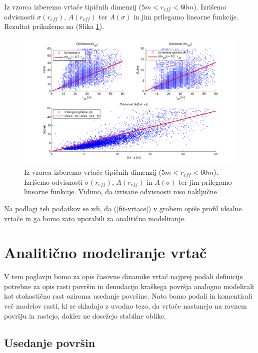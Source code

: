 \documentclass[a4paper, twoside, 12pt]{book}
\begin{document}
\newpage
Iz vzorca izberemo vrtače tipičnih dimenzij ($5m < r_{eff} < 60m$). Izrišemo odvisnosti $\sigma (r_{eff})$, $A (r_{eff})$ ter $A(\sigma)$ in jim prilegamo linearne funkcije. Rezultat prikažemo na (Slika \ref{fig:menisija-sigma}).

  \begin{figure}[h!]
    \begin{center}
      \includegraphics[width=14cm]{slike/menisija-A-sigma-reff}
    \end{center}
    \caption{Iz vzorca izberemo vrtače tipičnih dimenzij ($5m < r_{eff} < 60m$). Izrišemo odvisnosti $\sigma (r_{eff})$, $A (r_{eff})$ in $A(\sigma)$ ter jim prilegamo linearne funkcije. Vidimo, da izrisane odvisnosti niso naključne.}
    \label{fig:menisija-sigma}
  \end{figure}
\newpage
  Na podlagi teh podatkov se zdi, da (\ref{fit-vrtace}) v grobem opiše profil idealne vrtače in ga bomo zato uporabili za analitično modeliranje.

  \chapter{Analitično modeliranje vrtač}
  \label{analiticno-modeliranje}

V tem poglavju bomo za opis časovne dinamike vrtač najprej podali definicije potrebne za opis rasti površin in denudacijo kraškega površja analogno modelirali kot stohastično rast oziroma usedanje površine. Nato bomo podali in komentirali več modelov rasti, ki se skladajo z uvodno tezo, da vrtače nastanejo na ravnem površju in rastejo, dokler ne dosežejo stabilne oblike.

  \section{Usedanje površin}
  \label{definicije}
\end{document}
